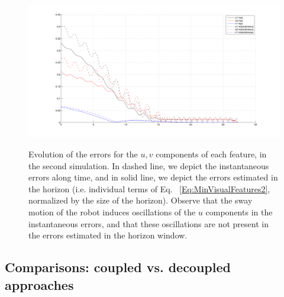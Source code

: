 \begin{figure}[ht]
 \centering
 \includegraphics[scale=.35]{Chap4-Visual-Servoing/errors_mpc_instantaneous}
 \label{Fig:Results6a}
 \caption[]{\label{Fig:Results6}\small{Evolution of the errors for the $u,v$ components of each feature, in the second simulation. In dashed line, we depict the instantaneous errors along time, and in solid line, we depict the errors estimated in the horizon (i.e. individual terms of Eq.~ \ref{Eq:MinVisualFeatures2}, normalized by the size of the horizon). Observe that the sway motion of the robot induces oscillations of the $u$ components in the instantaneous errors, and that these oscillations are not present in the errors estimated in the horizon window.}}
 \end{figure}

\subsection{Comparisons: coupled vs. decoupled approaches}

